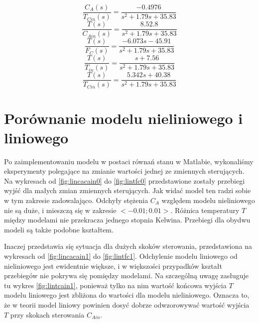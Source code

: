 \begin{equation}
\frac{C_A(s)}{T_{Cin}(s)} = \frac{-0.4976}{s^2+1.79s+35.83}
\end{equation}
\begin{equation}
\frac{T(s)}{C_{Ain}(s)} = \frac{8.52.8}{s^2+1.79s+35.83}
\end{equation}
\begin{equation}
\frac{T(s)}{F_C(s)} = \frac{-6.073s-45.91}{s^2+1.79s+35.83}
\end{equation}
\begin{equation}
\frac{T(s)}{T_{in}(s)} = \frac{s + 7.56}{s^2+1.79s+35.83}
\end{equation}
\begin{equation}
\frac{T(s)}{T_{Cin}(s)} = \frac{5.342 s + 40.38}{s^2+1.79s+35.83}
\end{equation}
\newpage
\section{Porównanie modelu nieliniowego i liniowego}
Po zaimplementowaniu modelu w postaci równań stanu w Matlabie, wykonaliśmy eksperymenty polegające na zmianie wartości jednej ze zmiennych sterujących. Na wykresach od \ref{fig:lincacain0} do \ref{fig:lintfc0} przedstawione zostały przebiegi wyjść dla małych zmian zmiennych sterujących. Jak widać model ten radzi sobie w tym zakresie zadowalająco. Odchyły stężenia $C_A$ względem modelu nieliniowego nie są duże, i mieszczą się w zakresie $<-0.01;0.01>$. Różnica temperatury $T$ między modelami nie przekracza jednego stopnia Kelwina. Przebiegi dla obydwu modeli są także podobne kształtem.

Inaczej przedstawia się sytuacja dla dużych skoków sterowania, przedstawiona na wykresach od \ref{fig:lincacain1} do \ref{fig:lintfc1}. Odchylenie modelu liniowego od nieliniowego jest ewidentnie większe, i  w większości przypadków kształt przebiegów nie pokrywa się pomiędzy modelami. Na szczególną uwagę zasługuje tu wykres \ref{fig:lintcain1}, ponieważ tylko na nim wartość końcowa wyjścia $T$ modelu liniowego jest zbliżona do wartości dla modelu nieliniowego. Oznacza to, że w teorii model liniowy powinien dosyć dobrze odwzorowywać wartość wyjścia $T$ przy skokach sterowania $C_{Ain}$.

